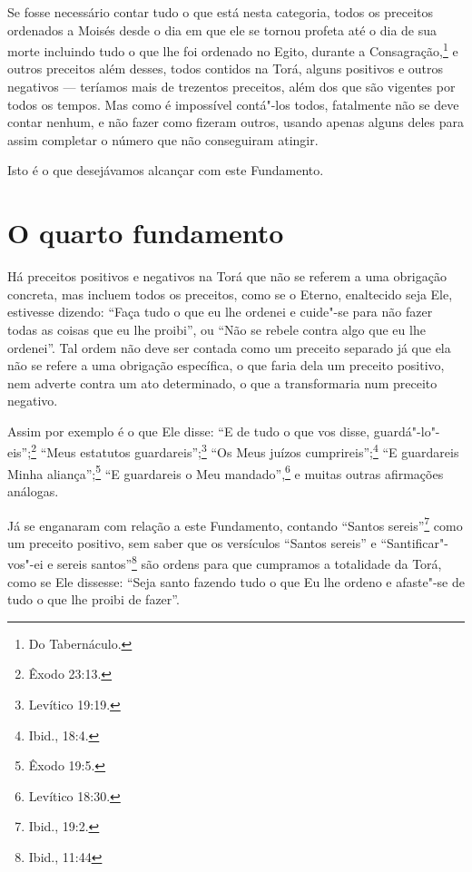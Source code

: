 Se fosse necessário contar tudo o que está nesta categoria, todos os
preceitos ordenados a Moisés desde o dia em que ele se tornou profeta
até o dia de sua morte incluindo tudo o que lhe foi ordenado no Egito,
durante a Consagração,\footnote{Do Tabernáculo.} e outros preceitos além
desses, todos contidos na Torá\starr, alguns positivos e outros negativos
--- teríamos mais de trezentos preceitos, além dos que são vigentes por
todos os tempos. Mas como é impossível contá"-los todos, fatalmente não
se deve contar nenhum, e não fazer como fizeram outros, usando apenas
alguns deles para assim completar o número que não conseguiram atingir.

Isto é o que desejávamos alcançar com este Fundamento.

\chapter*{O quarto fundamento}

Há preceitos positivos e negativos na Torá\starr{} que não se referem a uma
obrigação concreta, mas incluem todos os preceitos, como se o Eterno,
enaltecido seja Ele, estivesse dizendo: ``Faça tudo o que eu lhe ordenei
e cuide"-se para não fazer todas as coisas que eu lhe proibi'', ou ``Não
se rebele contra algo que eu lhe ordenei''. Tal ordem não deve ser
contada como um preceito separado já que ela não se refere a uma
obrigação específica, o que faria dela um preceito positivo, nem adverte
contra um ato determinado, o que a transformaria num preceito negativo.

Assim por exemplo é o que Ele disse: ``E de tudo o que vos disse,
guardá"-lo"-eis'';\footnote{Êxodo 23:13.} ``Meus estatutos guardareis'';\footnote{Levítico
19:19.} ``Os Meus juízos cumprireis'';\footnote{Ibid., 18:4.} ``E guardareis
Minha aliança'';\footnote{Êxodo 19:5.} ``E guardareis o Meu mandado'',\footnote{Levítico
18:30.} e muitas outras afirmações análogas.

Já se enganaram com relação a este Fundamento, contando ``Santos
sereis''\footnote{Ibid., 19:2.} como um preceito positivo, sem saber que os
versículos
``Santos sereis'' e ``Santificar"-vos"-ei e sereis santos''\footnote{Ibid., 11:44}
são ordens para que cumpramos a totalidade da Torá\starr, como se Ele
dissesse: ``Seja santo fazendo tudo o que Eu lhe ordeno e afaste"-se de
tudo o que lhe proibi de fazer''.

